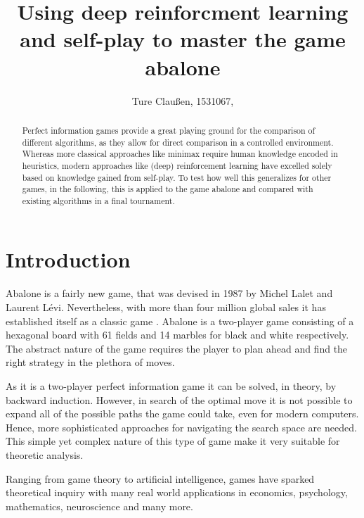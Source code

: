 \documentclass{../lib/llncs}
\begin{document}
\title{Using deep reinforcment learning and self-play to master the game abalone}
\author{Ture Claußen, 1531067, }

{\def\addcontentsline#1#2#3{}\maketitle} %

\begin{abstract}
    Perfect information games provide a great playing ground for the comparison of different algorithms, as they allow for direct comparison in a controlled environment. Whereas more classical approaches like minimax require human knowledge encoded in heuristics, modern approaches like (deep) reinforcement learning have excelled solely based on knowledge gained from self-play. To test how well this generalizes for other games, in the following, this is applied to the game abalone and compared with existing algorithms in a final tournament.
\end{abstract}


\section{Introduction}
Abalone is a fairly new game, that was devised in 1987 by Michel Lalet and Laurent Lévi. Nevertheless, with more than four million global sales it has established itself as a classic game \cite{noauthor_abalone_2020}. Abalone is a two-player game consisting of a hexagonal board with 61 fields and 14 marbles for black and white respectively. The abstract nature of the game requires the player to plan ahead and find the right strategy in the plethora of moves.

As it is a two-player perfect information game it can be solved, in theory, by backward induction. However, in search of the optimal move it is not possible to expand all of the possible paths the game could take, even for modern computers. Hence, more sophisticated approaches for navigating the search space are needed. This simple yet complex nature of this type of game make it very suitable for theoretic analysis. \cite[p. 1]{demichelis_simple_2004}

Ranging from game theory to artificial intelligence, games have sparked theoretical inquiry with many real world applications in economics, psychology, mathematics, neuroscience and many more. \cite[pp. 46]{russell_artificial_2021}
\end{document}
